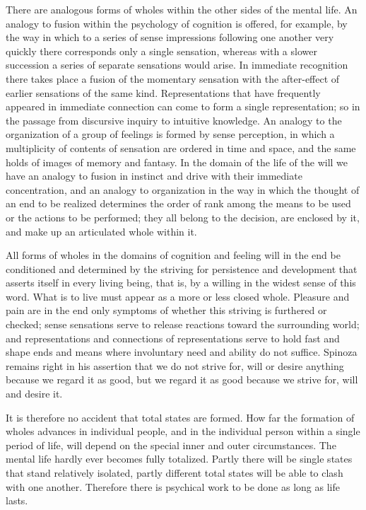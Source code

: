 \documentclass[12pt]{book}
\newcommand{\opage}[1]{\marginnote{\footnotesize\textit{[#1]}}}
\begin{document}
There are analogous forms of wholes within the other sides of the mental life.
An analogy to fusion within the psychology of cognition is offered, for example,
by the way in which to a series of sense impressions following one another very
quickly there corresponds only a single sensation, whereas with a slower
succession a series of separate sensations would arise. In immediate recognition
there takes place a fusion of the momentary sensation with the after-effect of
earlier sensations of the same kind. Representations that have frequently
appeared in immediate connection can come to form a single representation; so in
the passage from discursive inquiry to intuitive knowledge. An analogy to the
organization of a group of feelings is formed by sense perception, in which a
multiplicity of contents of sensation are ordered in time and space, and the same
holds of images of memory and fantasy. In the domain of the life of the will we
have an analogy to fusion in instinct and drive with their immediate
concentration, and an analogy to organization in the way in which the thought of
an end to be realized determines the order of rank among the means to be used or
the actions to be performed; they all belong to the decision, are enclosed by it,
and make up an articulated whole within it.

All forms of wholes in the domains of cognition and feeling will in the end be
conditioned and determined by the striving for persistence and development that
asserts itself in every living being, that is, by a willing in the widest sense
of this word. What is to live must appear as a more or less closed whole. Pleasure
and pain are in the end only symptoms of whether this striving is furthered or
checked; sense sensations serve to release reactions toward the surrounding
world; and representations and connections of representations serve to hold fast
and shape ends and means where involuntary need and ability do not suffice.
Spinoza remains right in his assertion that we do not strive for, will or desire
\opage{20}anything because we regard it as good, but we regard it as good
because we strive for, will and desire it.

It is therefore no accident that total states are formed. How far the formation
of wholes advances in individual people, and in the individual person within a
single period of life, will depend on the special inner and outer circumstances.
The mental life hardly ever becomes fully totalized. Partly there will be single
states that stand relatively isolated, partly different total states will be
able to clash with one another. Therefore there is psychical work to be done as
long as life lasts.
\end{document}
